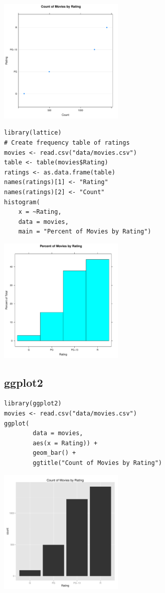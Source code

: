 \documentclass[a4paper, captions=tableheading]{tufte-book}
\begin{document}
\includegraphics[height=6cm]{img/1-cat-lattice-02.pdf}

\begin{verbatim}
library(lattice)
# Create frequency table of ratings
movies <- read.csv("data/movies.csv")
table <- table(movies$Rating)
ratings <- as.data.frame(table)
names(ratings)[1] <- "Rating"
names(ratings)[2] <- "Count"
histogram(
	x = ~Rating,
	data = movies,
	main = "Percent of Movies by Rating")
\end{verbatim}

\includegraphics[height=6cm]{img/1-cat-lattice-03.pdf}

\subsection{ggplot2}
\label{sec:orgheadline5}

\begin{verbatim}
library(ggplot2)
movies <- read.csv("data/movies.csv")
ggplot(
		data = movies,
		aes(x = Rating)) +
		geom_bar() +
		ggtitle("Count of Movies by Rating")
\end{verbatim}

\includegraphics[height=6cm]{img/1-cat-ggplot2-01.pdf}
\end{document}
